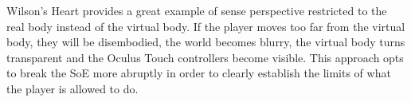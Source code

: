 Wilson's Heart provides a great example of sense perspective restricted to the real body instead of the virtual body. If the player moves too far from the virtual body, they will be disembodied, the world becomes blurry, the virtual body turns transparent and the Oculus Touch controllers become visible. This approach opts to break the SoE more abruptly in order to clearly establish the limits of what the player is allowed to do.